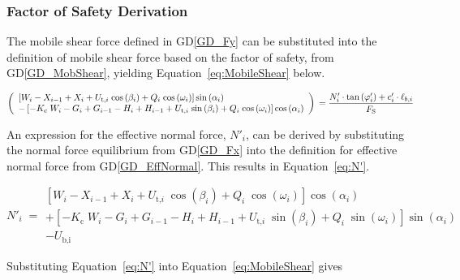 \documentclass[12pt]{article}
\newcommand{\dref}[1]{GD\ref{#1}}
\begin{document}

\subsubsection*{Factor of Safety Derivation}

The mobile shear force defined in \dref{GD_Fy} can be substituted into the 
definition of mobile shear force based on the factor of safety, from 
\dref{GD_MobShear}, yielding Equation~\ref{eq:MobileShear} below.

\begin{equation} \label{eq:MobileShear}
\left( \begin{array}{l} \left[
W_{i} -X_{i-1} + X_{i} +
{U_{\text{t,}i}}\;{\cos\left(\beta_{i}\right)} +
Q_{i}\;{\cos\left(\omega_{i}\right)}
\right]\sin\left(\alpha_{i}\right) \\ - \left[
{-K_{\text{c}}}\;{W_{i}} - G_{i} + G_{i-1}
- H_{i} + H_{i-1} +
{U_{\text{t,}i}}\;{\sin\left(\beta_{i}\right)} +
Q_{i}\;{\cos\left(\omega_{i}\right)}
\right]\cos\left(\alpha_{i}\right) \end{array} \right)\\ = \frac { 
N'_{i} \cdot \tan\left( \varphi'_{i}
	\right) + c'_i \cdot \ell_{b,i} }{F_\text{S}}
\end{equation}

\noindent An expression for the effective normal force, $N'_i$, can be derived 
by substituting the normal force equilibrium from \dref{GD_Fx} into the 
definition for effective normal force from \dref{GD_EffNormal}. This results in 
Equation~\ref{eq:N'}.
	
\begin{equation} \label{eq:N'}
N'_{i} \; = \begin{array}{l}
\left[ W_{i} - X_{i-1} + X_{i} +
{U_{\text{t,}i}}\;{\cos\left(\beta_{i}\right)} +
Q_{i}\;{\cos\left(\omega_{i}\right)}
\right]\cos\left(\alpha_{i}\right) \\ + \left[
{-K_{\text{c}}}\;{W_{i}} - G_{i} + G_{i-1} -
H_{i} + H_{i-1} +
{U_{\text{t,}i}}\;{\sin\left(\beta_{i}\right)} +
Q_{i}\;{\sin\left(\omega_{i}\right)}
\right]\sin\left(\alpha_{i}\right) \\ -
U_{\text{b,i}} \end{array}
\end{equation}

\noindent Substituting Equation~\ref{eq:N'} into Equation~\ref{eq:MobileShear} 
gives
\end{document}
